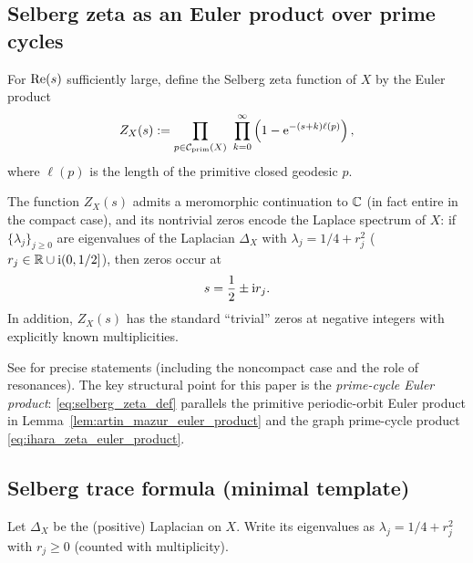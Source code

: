\subsection{Selberg zeta as an Euler product over prime cycles}
\label{subsec:selberg_zeta_euler_product}

\begin{definition}
\label{def:selberg_zeta_compact}
\MathTag For $\operatorname{Re}(s)$ sufficiently large, define the Selberg zeta function of $X$ by the Euler product
\begin{equation}
\label{eq:selberg_zeta_def}
Z_X(s):=\prod_{p\in\mathcal{C}_{\mathrm{prim}}(X)}\ \prod_{k=0}^{\infty}\left(1-\e^{-(s+k)\ell(p)}\right),
\end{equation}
where $\ell(p)$ is the length of the primitive closed geodesic $p$.
\end{definition}

\begin{theorem}
\label{thm:selberg_zeta_zeros_standard}
\MathTag The function $Z_X(s)$ admits a meromorphic continuation to $\mathbb{C}$ (in fact entire in the compact case), and its nontrivial zeros encode the Laplace spectrum of $X$:
if $\{\lambda_j\}_{j\ge 0}$ are eigenvalues of the Laplacian $\Delta_X$ with $\lambda_j=1/4+r_j^2$ ($r_j\in\mathbb{R}\cup \mathrm{i}(0,1/2]$), then zeros occur at
\[
s=\frac12\pm \mathrm{i} r_j.
\]
In addition, $Z_X(s)$ has the standard ``trivial'' zeros at negative integers with explicitly known multiplicities.
\end{theorem}
\begin{remark}
See \cite{Hejhal1983,Buser1992,Iwaniec2002} for precise statements (including the noncompact case and the role of resonances).
The key structural point for this paper is the \emph{prime-cycle Euler product}: \eqref{eq:selberg_zeta_def} parallels the primitive periodic-orbit Euler product in Lemma~\ref{lem:artin_mazur_euler_product} and the graph prime-cycle product \eqref{eq:ihara_zeta_euler_product}.
\end{remark}

\subsection{Selberg trace formula (minimal template)}
\label{subsec:selberg_trace_formula_minimal}

Let $\Delta_X$ be the (positive) Laplacian on $X$.
Write its eigenvalues as $\lambda_j=1/4+r_j^2$ with $r_j\ge 0$ (counted with multiplicity).

